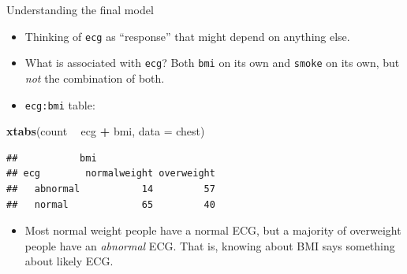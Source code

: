 \documentclass[ignorenonframetext,]{beamer}
\newenvironment{Shaded}{\begin{snugshade}}{\end{snugshade}}
\newcommand{\DataTypeTok}[1]{\textcolor[rgb]{0.13,0.29,0.53}{#1}}
\newcommand{\KeywordTok}[1]{\textcolor[rgb]{0.13,0.29,0.53}{\textbf{#1}}}
\newcommand{\NormalTok}[1]{#1}
\newcommand{\OperatorTok}[1]{\textcolor[rgb]{0.81,0.36,0.00}{\textbf{#1}}}
\newcommand{\StringTok}[1]{\textcolor[rgb]{0.31,0.60,0.02}{#1}}
\providecommand{\tightlist}{%
  \setlength{\itemsep}{0pt}\setlength{\parskip}{0pt}}
\begin{document}
\begin{frame}[fragile]{Understanding the final model}
\protect\hypertarget{understanding-the-final-model}{}

\begin{itemize}
\item
  Thinking of \texttt{ecg} as ``response'' that might depend on anything
  else.
\item
  What is associated with \texttt{ecg}? Both \texttt{bmi} on its own and
  \texttt{smoke} on its own, but \emph{not} the combination of both.
\item
  \texttt{ecg:bmi} table:
\end{itemize}

\begin{Shaded}
\begin{Highlighting}[]
\KeywordTok{xtabs}\NormalTok{(count }\OperatorTok{~}\StringTok{ }\NormalTok{ecg }\OperatorTok{+}\StringTok{ }\NormalTok{bmi, }\DataTypeTok{data =}\NormalTok{ chest)}
\end{Highlighting}
\end{Shaded}

\begin{verbatim}
##           bmi
## ecg        normalweight overweight
##   abnormal           14         57
##   normal             65         40
\end{verbatim}

\begin{itemize}
\tightlist
\item
  Most normal weight people have a normal ECG, but a majority of
  overweight people have an \emph{abnormal} ECG. That is, knowing about
  BMI says something about likely ECG.
\end{itemize}

\end{frame}
\end{document}
